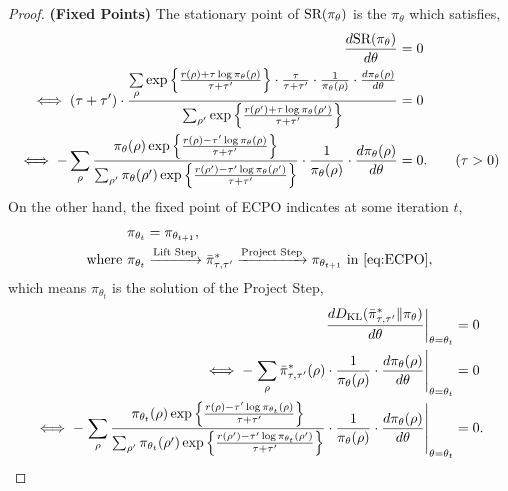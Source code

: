 \begin{proof}
	{\bf (Fixed Points)} The stationary point of $\text{SR}(\pi_{\theta})$ is the $\pi_\theta$ which satisfies,
	\begin{equation}
	\label{eq:stationary_point_of_sr}
	\begin{split}
		\frac{d \text{SR}(\pi_{\theta})}{d \theta} &= 0 \\
		\iff (\tau + \tau^\prime) \cdot \frac{ \sum\limits_{\rho}{ \exp\left\{ \frac{r(\rho) + \tau \log{\pi_\theta(\rho)} }{\tau + \tau^{\prime}} \right\} } \cdot \frac{\tau}{ \tau + \tau^\prime} \cdot \frac{1}{ \pi_\theta(\rho)} \cdot \frac{d \pi_{\theta}(\rho)}{d \theta} }{  \sum_{\rho^\prime}{ \exp\left\{ \frac{r(\rho^\prime) + \tau \log{\pi_\theta(\rho^\prime)} }{\tau + \tau^{\prime}} \right\} } } &= 0 \\
		\iff - \sum\limits_{\rho}{ \frac{ \pi_\theta(\rho) \exp\left\{ \frac{r(\rho) - \tau^\prime \log{\pi_\theta(\rho)} }{\tau + \tau^{\prime}} \right\}  }{  \sum_{\rho^\prime}{ \pi_\theta(\rho^\prime) \exp\left\{ \frac{r(\rho^\prime) - \tau^\prime \log{\pi_\theta(\rho^\prime)} }{\tau + \tau^{\prime}} \right\} } } \cdot \frac{1}{ \pi_\theta(\rho)} \cdot \frac{d \pi_{\theta}(\rho)}{d \theta} } &= 0. \qquad (\tau > 0)
	\end{split}
	\end{equation}
	On the other hand, the fixed point of ECPO indicates at some iteration $t$,
	\begin{equation}
	\label{eq:fixed_point_of_ECPO_iter}
	\begin{split}
		&\pi_{\theta_t} = \pi_{\theta_{t+1}}, \\
		\text{where } &\pi_{\theta_t} \xrightarrow{\text{Lift Step}} \bar{\pi}_{\tau,\tau^{\prime}}^* \xrightarrow{\text{Project Step}} \pi_{\theta_{t+1}} \text{ in \cref{eq:ECPO}},
	\end{split}
	\end{equation}
	which means $\pi_{\theta_t}$ is the solution of the Project Step,
	\begin{equation}
	\label{eq:solution_of_project_step_ECPO}
	\begin{split}
		\left. \frac{d \KL( \bar{\pi}_{\tau,\tau^{\prime}}^* \| \pi_{\theta}) }{d \theta} \right\vert_{\theta = \theta_t} &= 0 \\
		\iff - \left. \sum\limits_{\rho}{ \bar{\pi}_{\tau,\tau^{\prime}}^*(\rho) \cdot \frac{1}{ \pi_\theta(\rho)} \cdot \frac{d \pi_{\theta}(\rho)}{d \theta} } \right\vert_{\theta = \theta_t} &= 0 \\
		\iff - \left. \sum\limits_{\rho}{ \frac{ \pi_{\theta_t}(\rho) \exp\left\{ \frac{r(\rho) - \tau^\prime \log{\pi_{\theta_t}(\rho)} }{\tau + \tau^{\prime}} \right\}  }{  \sum_{\rho^\prime}{ \pi_{\theta_t}(\rho^\prime) \exp\left\{ \frac{r(\rho^\prime) - \tau^\prime \log{\pi_{\theta_t}(\rho^\prime)} }{\tau + \tau^{\prime}} \right\} } } \cdot \frac{1}{ \pi_\theta(\rho)} \cdot \frac{d \pi_{\theta}(\rho)}{d \theta} } \right\vert_{\theta = \theta_t} &= 0. \\

\end{split}
\end{equation}
\end{proof}
